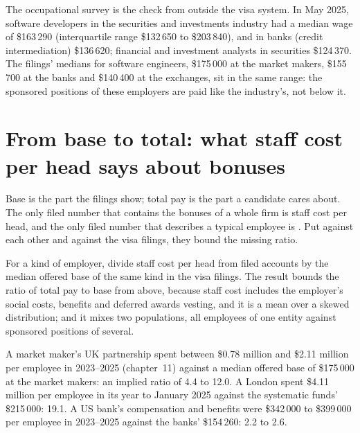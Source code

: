 The occupational survey is the check from outside the visa system. In May 2025, software developers in the securities
and investments industry had a median wage of \$163\,290 (interquartile range \$132\,650 to \$203\,840), and in banks
(credit intermediation) \$136\,620; financial and investment analysts in securities \$124\,370. The filings' medians for
software engineers, \$175\,000 at the market makers, \$155\,700 at the banks and \$140\,400 at the exchanges, sit in the
same range: the sponsored positions of these employers are paid like the industry's, not below it.

\section{From base to total: what staff cost per head says about bonuses}

Base is the part the filings show; total pay is the part a candidate cares about. The only filed number that contains
the bonuses of a whole firm is staff cost per head, and the only filed number that describes a typical employee is
. Put against each other and against the visa filings, they bound the missing ratio.

\begin{method}\label{met:in:pay-levels-by-role-firm-type-and-seniority:ratio}
For a kind of employer, divide staff cost per head from filed accounts by the median offered base of the same kind in
the visa filings. The result bounds the ratio of total pay to base from above, because staff cost includes the
employer's social costs, benefits and deferred awards vesting, and it is a mean over a skewed distribution; and it mixes
two populations, all employees of one entity against sponsored positions of several.
\end{method}

\begin{example}\label{ex:in:pay-levels-by-role-firm-type-and-seniority:ratio}
A market maker's UK partnership spent between \$0.78 million and \$2.11 million per employee in 2023--2025 (chapter~11)
against a median offered base of \$175\,000 at the market makers: an implied ratio of 4.4 to 12.0. A London  spent \$4.11 million per employee in its year to January 2025 against the systematic funds' \$215\,000: 19.1. A US
bank's compensation and benefits were \$342\,000 to \$399\,000 per employee in 2023--2025 against the banks' \$154\,260:
2.2 to 2.6.
\end{example}

